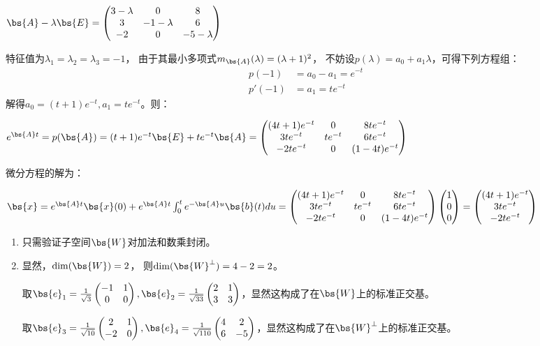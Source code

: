 $\bs{A}-\lambda\bs{E}=\begin{pmatrix}
3-\lambda& 0& 8 \\
3& -1-\lambda& 6 \\
-2& 0 &-5-\lambda
\end{pmatrix}$

特征值为$\lambda_1=\lambda_2=\lambda_3=-1$，
由于其最小多项式$m_{\bs{A}}(\lambda)=(\lambda+1)^2$，
不妨设$p(\lambda)=a_0+a_1\lambda$，可得下列方程组：
\begin{align*}
p(-1)&=a_0-a_1=e^{-t} \\
p'(-1)&=a_1=te^{-t}
\end{align*}
解得$a_0=(t+1)e^{-t},a_1=te^{-t}$。则：

$e^{\bs{A}t}=p(\bs{A})=
(t+1)e^{-t}\bs{E}+te^{-t}\bs{A}=\begin{pmatrix}
    (4t+1)e^{-t} & 0 & 8te^{-t} \\
    3te^{-t} & te^{-t} & 6te^{-t} \\
    -2te^{-t}& 0 &(1-4t)e^{-t}
\end{pmatrix}    $

微分方程的解为：

$\bs{x}=e^{\bs{A}t}\bs{x}(0)+e^{\bs{A}t} \int_{0}^t e^{-\bs{A}u}\bs{b}(t)du
=\begin{pmatrix}
    (4t+1)e^{-t} & 0 & 8te^{-t} \\
    3te^{-t} & te^{-t} & 6te^{-t} \\
    -2te^{-t}& 0 &(1-4t)e^{-t}
\end{pmatrix} \begin{pmatrix}
    1 \\
    0\\
    0
\end{pmatrix}=
\begin{pmatrix}
    (4t+1)e^{-t}  \\
    3te^{-t}  \\
    -2te^{-t}
\end{pmatrix}$


\begin{enumerate}
\item 只需验证子空间$\bs{W}$对加法和数乘封闭。
\item 显然，$\dim(\bs{W})=2$，
则$\dim(\bs{W}^{\perp})=4-2=2$。

取$\bs{e}_1=\frac{1}{\sqrt{3}}\begin{pmatrix}
    -1 & 1\\
    0 & 0
\end{pmatrix},\bs{e}_2=\frac{1}{\sqrt{33}}\begin{pmatrix}
    2 & 1\\
    3 & 3
\end{pmatrix}$，显然这构成了在$\bs{W}$上的标准正交基。

取$\bs{e}_3=\frac{1}{\sqrt{10}}\begin{pmatrix}
    2 & 1\\
    -2 & 0
\end{pmatrix},\bs{e}_4=\frac{1}{\sqrt{110}}\begin{pmatrix}
    4 & 2\\
    6 & -5
\end{pmatrix}$，显然这构成了在$\bs{W}^{\perp}$上的标准正交基。
\end{enumerate}


